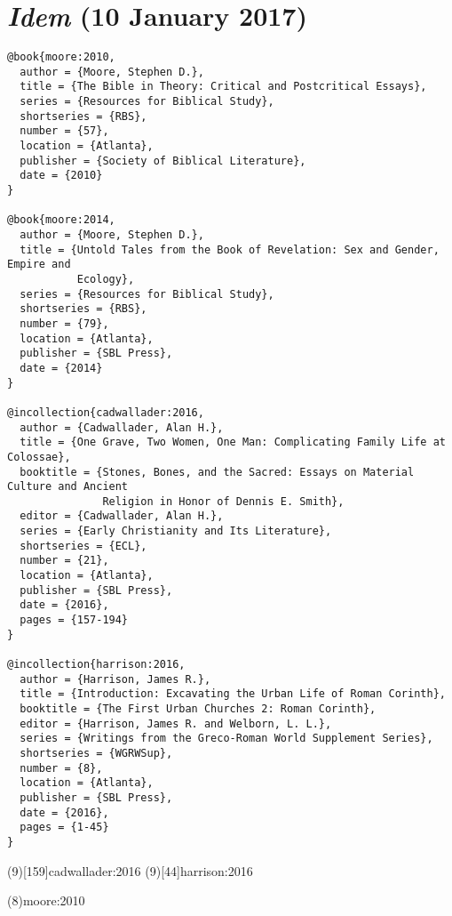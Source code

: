 \documentclass[a4paper]{article}
\begin{document}
\section{\emph{Idem} (10 January 2017)}

\begin{verbatim}
@book{moore:2010,
  author = {Moore, Stephen D.},
  title = {The Bible in Theory: Critical and Postcritical Essays},
  series = {Resources for Biblical Study},
  shortseries = {RBS},
  number = {57},
  location = {Atlanta},
  publisher = {Society of Biblical Literature},
  date = {2010}
}

@book{moore:2014,
  author = {Moore, Stephen D.},
  title = {Untold Tales from the Book of Revelation: Sex and Gender, Empire and
           Ecology},
  series = {Resources for Biblical Study},
  shortseries = {RBS},
  number = {79},
  location = {Atlanta},
  publisher = {SBL Press},
  date = {2014}
}

@incollection{cadwallader:2016,
  author = {Cadwallader, Alan H.},
  title = {One Grave, Two Women, One Man: Complicating Family Life at Colossae},
  booktitle = {Stones, Bones, and the Sacred: Essays on Material Culture and Ancient
               Religion in Honor of Dennis E. Smith},
  editor = {Cadwallader, Alan H.},
  series = {Early Christianity and Its Literature},
  shortseries = {ECL},
  number = {21},
  location = {Atlanta},
  publisher = {SBL Press},
  date = {2016},
  pages = {157-194}
}

@incollection{harrison:2016,
  author = {Harrison, James R.},
  title = {Introduction: Excavating the Urban Life of Roman Corinth},
  booktitle = {The First Urban Churches 2: Roman Corinth},
  editor = {Harrison, James R. and Welborn, L. L.},
  series = {Writings from the Greco-Roman World Supplement Series},
  shortseries = {WGRWSup},
  number = {8},
  location = {Atlanta},
  publisher = {SBL Press},
  date = {2016},
  pages = {1-45}
}
\end{verbatim}

\begin{fverbcite}{8}
  \autocites{moore:2010}{moore:2014}
\end{fverbcite}
\examplecite(9)[159]{cadwallader:2016}
\examplecite(9)[44]{harrison:2016}
\begin{verbcite}
  \citereset
\end{verbcite}
\examplecite(8){moore:2010}
\begin{fverbcite}{9}
  \autocites[See][25]{moore:2010}[57]{moore:2014}
\end{fverbcite}
\exampleabbreviations
\examplebibliography
{}
\end{document}
